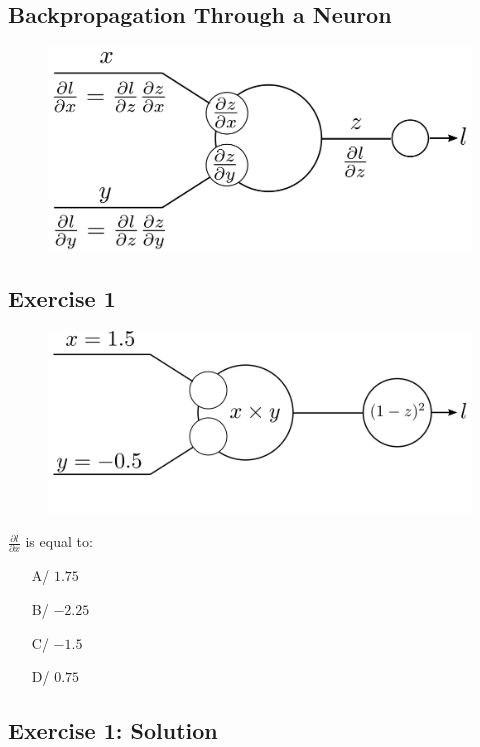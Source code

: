 \documentclass{book}
\begin{document}
\subsection{Backpropagation Through a Neuron}

\begin{figure}[h]
    \centering
    \includegraphics[width=\textwidth]{bp_2_1_neuron.png}
\end{figure}

\subsection{Exercise 1}

\begin{figure}[h]
    \centering
    \includegraphics[width=\textwidth]{bp_2_1_neuron_exo.png}
\end{figure}

$\frac{\partial l}{\partial x}$ is equal to:

\begin{itemize}
\item[A/] $1.75$
\item[B/] $-2.25$
\item[C/] $-1.5$
\item[D/] $0.75$
\end{itemize}

\subsection{Exercise 1: Solution}
\end{document}

